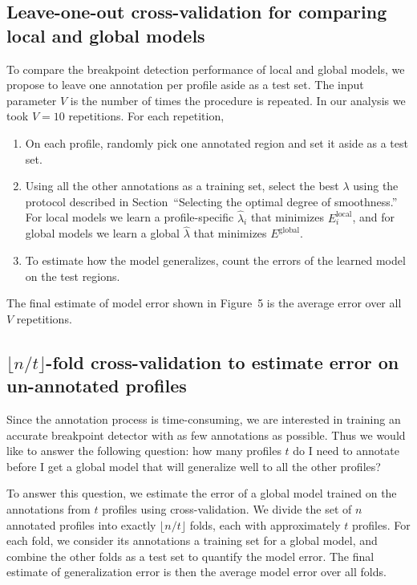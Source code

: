 \documentclass[10pt]{bmc_article}
\newcommand{\sectionpick}{Selecting the optimal degree of smoothness}
\newenvironment{bmcformat}{\begin{raggedright}\baselineskip20pt\sloppy\setboolean{publ}{false}}{\end{raggedright}\baselineskip20pt\sloppy}
\begin{document}
\begin{bmcformat}
\subsection*{Leave-one-out cross-validation for comparing local and
  global models}
To compare the breakpoint detection performance of local and global
models, we propose to leave one annotation per profile aside as a test
set. The input parameter $V$ is the number of times the procedure is
repeated. In our analysis we took $V=10$ repetitions. For each
repetition,
\begin{enumerate}
\item On each profile, randomly pick one annotated region and set it
  aside as a test set.
\item Using all the other annotations as a training set, select the
  best $\lambda$ using the protocol described in
  Section~``\sectionpick.''  For local models we learn a
  profile-specific $\hat \lambda_i$ that minimizes
  $E_i^{\text{local}}$, and for global models we learn a global $\hat
  \lambda$ that minimizes $E^{\text{global}}$.
\item To estimate how the model generalizes, count the errors of the
  learned model on the test regions.
\end{enumerate}
The final estimate of model error shown in Figure~5 is the average
error over all $V$ repetitions.

\subsection*{$\lfloor n/t\rfloor$-fold cross-validation to estimate
  error on un-annotated profiles}

Since the annotation process is time-consuming, we are interested in
training an accurate breakpoint detector with as few annotations as
possible. Thus we would like to answer the following question: how
many profiles $t$ do I need to annotate before I get a global model
that will generalize well to all the other profiles?

To answer this question, we estimate the error of a global model
trained on the annotations from $t$ profiles using
cross-validation. We divide the set of $n$ annotated profiles into
exactly $\lfloor n/t \rfloor$ folds, each with approximately $t$
profiles. For each fold, we consider its annotations a training set
for a global model, and combine the other folds as a test set to
quantify the model error. The final estimate of generalization error
is then the average model error over all folds.




\end{bmcformat}
\end{document}
